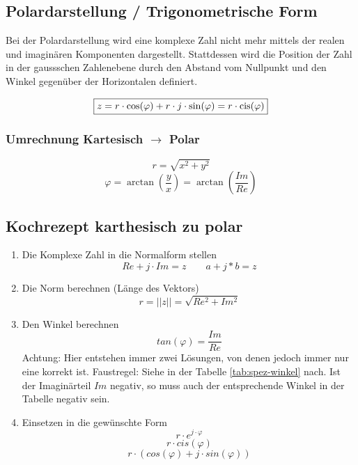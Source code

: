 \subsection{Polardarstellung / Trigonometrische Form}
Bei der Polardarstellung wird eine komplexe Zahl nicht mehr mittels der realen 
und imaginären Komponenten dargestellt. Stattdessen wird die Position der Zahl 
in der gaussschen Zahlenebene durch den Abstand vom Nullpunkt und den Winkel 
gegenüber der Horizontalen definiert. 
\begin{center}
\end{center}
\[ \boxed{z = r \cdot \cos(\varphi) + r \cdot j \cdot \sin(\varphi) 
= r \cdot \operatorname{cis}(\varphi)} \]

\subsubsection{Umrechnung Kartesisch $\rightarrow$ Polar}
\[ \boxed{r = \sqrt{x^2 + y^2}} \]
\[ \boxed{\varphi = \arctan{\left(\frac{y}{x}\right)} = 
          \arctan{\left(\frac{Im}{Re}\right)}} \]
\subsection{Kochrezept karthesisch zu polar}
\begin{enumerate}
	\item Die Komplexe Zahl in die Normalform stellen 
		\[ Re + j\cdot Im = z \qquad a + j*b = z \]
	\item Die Norm berechnen (Länge des Vektors)
		\[ r=||z||=\sqrt{Re^2+Im^2} \]
	\item Den Winkel berechnen
		\[ tan(\varphi)=\frac{Im}{Re} \]
		Achtung: Hier entstehen immer zwei Lösungen, von denen jedoch
		immer nur eine korrekt ist.
		Faustregel: Siehe in der Tabelle \ref{tab:spez-winkel} nach. 
		Ist der Imaginärteil $Im$ negativ, so muss auch der entsprechende
		Winkel in der Tabelle negativ sein.
	\item Einsetzen in die gewünschte Form
		\[ r \cdot e^{j\cdot\varphi} \]
		\[ r \cdot cis(\varphi) \]
		\[ r \cdot (cos(\varphi) + j \cdot sin(\varphi)) \]
\end{enumerate}

